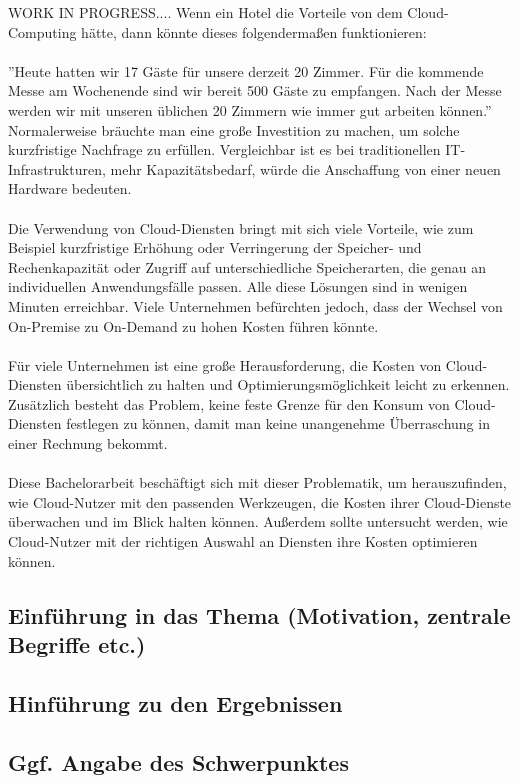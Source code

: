 WORK IN PROGRESS....
Wenn ein Hotel die Vorteile von dem Cloud-Computing hätte, dann könnte dieses folgendermaßen funktionieren:
\\\\
”Heute hatten wir 17 Gäste für unsere derzeit 20 Zimmer. Für die kommende Messe am Wochenende sind wir bereit 500 Gäste zu empfangen. Nach der Messe werden wir mit unseren üblichen 20 Zimmern wie immer gut arbeiten können.”
Normalerweise bräuchte man eine große Investition zu machen, um solche kurzfristige Nachfrage zu erfüllen. Vergleichbar ist es bei traditionellen IT-Infrastrukturen, mehr Kapazitätsbedarf, würde die Anschaffung von einer neuen Hardware bedeuten.
\\\\
Die Verwendung von Cloud-Diensten bringt mit sich viele Vorteile, wie zum Beispiel kurzfristige Erhöhung oder Verringerung der Speicher- und Rechenkapazität oder Zugriff auf unterschiedliche Speicherarten, die genau an individuellen Anwendungsfälle passen. Alle diese Lösungen sind in wenigen Minuten erreichbar. Viele Unternehmen befürchten jedoch, dass der Wechsel von On-Premise zu On-Demand zu hohen Kosten führen könnte.
\\\\
Für viele Unternehmen ist eine große Herausforderung, die Kosten von Cloud-Diensten übersichtlich zu halten und Optimierungsmöglichkeit leicht zu erkennen. Zusätzlich besteht das Problem, keine feste Grenze für den Konsum von Cloud-Diensten festlegen zu können, damit man keine unangenehme Überraschung in einer Rechnung bekommt. 
\\\\
Diese Bachelorarbeit beschäftigt sich mit dieser Problematik, um herauszufinden, wie Cloud-Nutzer mit den passenden Werkzeugen, die Kosten ihrer Cloud-Dienste überwachen und im Blick halten können. Außerdem sollte untersucht werden, wie Cloud-Nutzer mit der richtigen Auswahl an Diensten ihre Kosten optimieren können.
\subsection{Einführung in das Thema (Motivation, zentrale Begriffe etc.)}
\subsection{Hinführung zu den Ergebnissen}
\subsection{Ggf. Angabe des Schwerpunktes}
